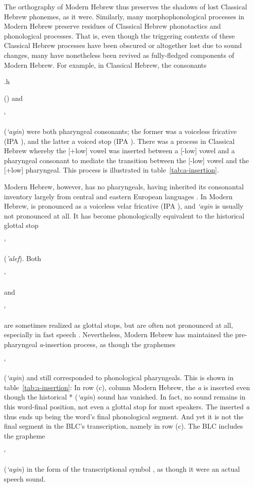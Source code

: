 The orthography of Modern Hebrew thus preserves the shadows of 
lost Classical Hebrew phonemes, as it were. 
Similarly, many morphophonological processes in Modern Hebrew
preserve residues of Classical Hebrew phonotactics and phonological processes. 
That is, even though the triggering contexts of these Classical Hebrew processes 
have been obscured or altogether lost due to sound changes, 
many have nonetheless been revived as fully-fledged components of Modern Hebrew. 
For example, in Classical Hebrew, the consonants \begin{cjhebrew}.h\end{cjhebrew} 
(\textit{}) and \begin{cjhebrew}`\end{cjhebrew}
(\textit{`ayin}) were both pharyngeal consonants; the former 
was a voiceless fricative (IPA \textipa{[\textcrh]}), and the latter a 
voiced stop (IPA \textipa{[Q]}). There was a process in Classical Hebrew 
whereby the [+low] vowel \textipa{[a]} was inserted between 
a [-low] vowel and a pharyngeal consonant to
mediate the transition between the [-low] vowel and the 
[+low] pharyngeal. This process is illustrated in table~\ref{tab:a-insertion}. 

Modern Hebrew, however, has no pharyngeals, having 
inherited its consonantal inventory 
largely from central and eastern European languages 
\citep{montoya:2014}. 
In Modern Hebrew, \textipa{[\textcrh]} 
is pronounced as a voiceless velar fricative 
(IPA \textipa{[x]}), and \textit{`ayin} 
is usually not pronounced at all. It has become 
phonologically 
equivalent to the historical glottal stop 
\begin{cjhebrew}'\end{cjhebrew} 
(\textit{'alef}). Both \begin{cjhebrew}'\end{cjhebrew} and 
\begin{cjhebrew}`\end{cjhebrew} 
are sometimes realized as glottal stops, but are 
often not pronounced at all, 
especially in fast speech \citep{matras-and-schiff:2005,berman:1985}. 
Nevertheless, Modern Hebrew has maintained the pre-pharyngeal 
\textit{a}-insertion process, as though the graphemes 
\begin{cjhebrew}`\end{cjhebrew} (\textit{`ayin}) and 
\textit{} still corresponded 
to phonological pharyngeals. This is shown in table~\ref{tab:a-insertion}:
In row (c), column Modern Hebrew, the \textit{a} is inserted 
even though the historical *\textipa{\textrevglotstop} 
(\textit{`ayin}) sound has vanished. In fact, no sound remains in this 
word-final position, not even a glottal stop for most 
speakers. The inserted \textit{a} thus ends up being the 
word's final phonological segment. And yet it is not the final segment
in the BLC's transcription, namely  in row (c). 
The BLC includes the grapheme \begin{cjhebrew}`\end{cjhebrew} 
(\textit{`ayin}) in the form of the transcriptional 
symbol \textipa{[\textrevglotstop]}, as though it
were an actual speech sound.

